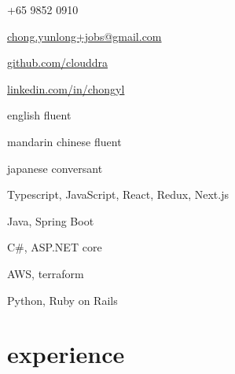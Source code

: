 \documentclass[]{cv} %
\begin{document}

\begin{multicols}{3}
\begin{infoitemize}
\item +65 9852 0910
\item \href{mailto:chong.yunlong+jobs@gmail.com}{chong.yunlong+jobs@gmail.com}
\item \href{https://github.com/clouddra}{github.com/clouddra}
\item \href{https://sg.linkedin.com/in/chongyl}{linkedin.com/in/chongyl}
\end{infoitemize}
\vspace*{\fill}
\columnbreak
{}
\begin{infoitemize}
\item english \to fluent
\item mandarin chinese \to fluent
\item japanese \to conversant
\end{infoitemize}
\vspace*{\fill}
\columnbreak
{}
\begin{infoitemize}
\item Typescript, JavaScript, React, Redux, Next.js
\item Java, Spring Boot
\item C\#, ASP.NET core
\item AWS, terraform
\item Python, Ruby on Rails
\end{infoitemize}
\end{multicols}

\vspace{-2\parsep}


\section{experience}
\end{document}

